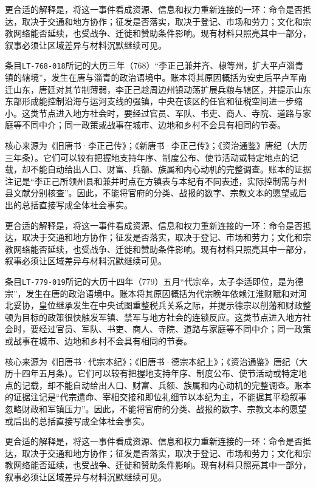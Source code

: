 更合适的解释是，将这一事件看成资源、信息和权力重新连接的一环：命令是否抵达，取决于交通和地方协作；征发是否落实，取决于登记、市场和劳力；文化和宗教网络能否延续，也受战争、迁徙和赞助条件影响。现有材料只照亮其中一部分，叙事必须让区域差异与材料沉默继续可见。

条目\texttt{LT-768-018}所记的大历三年（768）“李正己兼并齐、棣等州，扩大平卢淄青镇的辖境”，发生在唐与淄青的政治语境中。账本将其原因概括为安史后平卢军南迁山东，唐廷对其节制薄弱，李正己趁周边州镇动荡扩展兵粮与辖区，并提示山东东部形成能控制沿海与运河支线的强镇，中央在该区的任官和征税空间进一步缩小。这类节点进入地方社会时，要经过官员、军队、书吏、商人、寺院、道路与家庭等不同中介；同一政策或战事在城市、边地和乡村不会具有相同的节奏。

核心来源为《旧唐书·李正己传》；《新唐书·李正己传》；《资治通鉴》唐纪（大历三年条）。它们可以较有把握地支持年序、制度公布、使节活动或特定地点的记载，却不能自动给出人口、财富、兵额、族属和内心动机的完整调查。账本的证据注记是“李正己所领州县和兼并时点在方镇表与本纪有不同表述，实际控制需与州县文献分别核查”。因此，不能将官府的分类、战报的数字、宗教文本的愿望或后出的总括直接写成全体社会事实。

更合适的解释是，将这一事件看成资源、信息和权力重新连接的一环：命令是否抵达，取决于交通和地方协作；征发是否落实，取决于登记、市场和劳力；文化和宗教网络能否延续，也受战争、迁徙和赞助条件影响。现有材料只照亮其中一部分，叙事必须让区域差异与材料沉默继续可见。

条目\texttt{LT-779-019}所记的大历十四年（779）五月“代宗卒，太子李适即位，是为德宗”，发生在唐的政治语境中。账本将其原因概括为代宗晚年依赖江淮财赋和对河北妥协，皇位继承发生在中央试图重整税兵关系之际，并提示德宗以削藩和财政整顿为目标的政策很快触发军镇、禁军与地方社会的连锁反应。这类节点进入地方社会时，要经过官员、军队、书吏、商人、寺院、道路与家庭等不同中介；同一政策或战事在城市、边地和乡村不会具有相同的节奏。

核心来源为《旧唐书·代宗本纪》；《旧唐书·德宗本纪上》；《资治通鉴》唐纪（大历十四年五月条）。它们可以较有把握地支持年序、制度公布、使节活动或特定地点的记载，却不能自动给出人口、财富、兵额、族属和内心动机的完整调查。账本的证据注记是“代宗遗命、宰相交接和即位礼细节以本纪为主，不能据其平稳叙事忽略财政和军镇压力”。因此，不能将官府的分类、战报的数字、宗教文本的愿望或后出的总括直接写成全体社会事实。

更合适的解释是，将这一事件看成资源、信息和权力重新连接的一环：命令是否抵达，取决于交通和地方协作；征发是否落实，取决于登记、市场和劳力；文化和宗教网络能否延续，也受战争、迁徙和赞助条件影响。现有材料只照亮其中一部分，叙事必须让区域差异与材料沉默继续可见。

